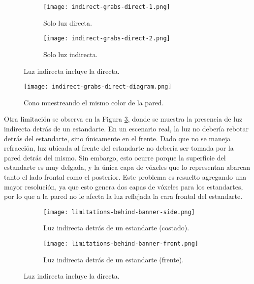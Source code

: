 \begin{figure}[h]
    \begin{center}
    \begin{subfigure}{.49\textwidth}
        \texttt{[image: indirect-grabs-direct-1.png]}
        \caption{Solo luz directa.}
    \end{subfigure}
    \begin{subfigure}{.49\textwidth}
        \texttt{[image: indirect-grabs-direct-2.png]}
        \caption{Solo luz indirecta.}
    \end{subfigure}
    \caption{Luz indirecta incluye la directa.}
    \label{fig:indirect-grabs-direct}
    \end{center}
\end{figure}

\begin{figure}[h]
	\begin{center}
	\texttt{[image: indirect-grabs-direct-diagram.png]}
	\caption{Cono muestreando el mismo color de la pared.}
	\label{fig:indirect-grabs-direct-diagram}
	\end{center}
\end{figure}

Otra limitación se observa en la Figura \ref{fig:indirect-behind-banner}, donde se muestra la presencia de luz indirecta detrás de un estandarte.
En un escenario real, la luz no debería rebotar detrás del estandarte, sino únicamente en el frente.
Dado que no se maneja refracción, luz ubicada al frente del estandarte no debería ser tomada por la pared detrás del mismo.
Sin embargo, esto ocurre porque la superficie del estandarte es muy delgada, y la única capa de vóxeles que lo representan abarcan tanto el lado frontal como el posterior.
Este problema es resuelto agregando una mayor resolución, ya que esto genera dos capas de vóxeles para los estandartes, por lo que a la pared no le afecta la luz reflejada la cara frontal del estandarte.

\begin{figure}[h]
    \begin{center}
    \begin{subfigure}{.49\textwidth}
        \texttt{[image: limitations-behind-banner-side.png]}
        \caption{Luz indirecta detrás de un estandarte (costado).}
    \end{subfigure}
    \begin{subfigure}{.49\textwidth}
        \texttt{[image: limitations-behind-banner-front.png]}
        \caption{Luz indirecta detrás de un estandarte (frente).}
    \end{subfigure}
    \caption{Luz indirecta incluye la directa.}
	\label{fig:indirect-behind-banner}
    \end{center}
\end{figure}
